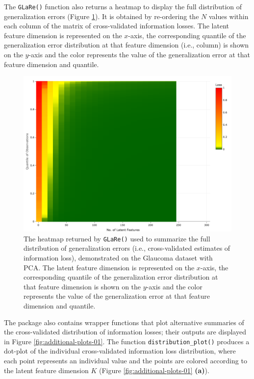 The \texttt{GLaRe()} function also returns a heatmap to display the full distribution of generalization errors (Figure \ref{fig:eye-heatmap}).
It is obtained by re-ordering the $N$ values within each column of the matrix of cross-validated information losses.
The latent feature dimension is represented on the $x$-axis, the corresponding quantile of the generalization error distribution at that feature dimension (i.e., column) is shown on the $y$-axis and the color represents the value of the generalization error at that feature dimension and quantile.


\begin{figure}
    \centering
    \includegraphics[width=0.5\linewidth]{figures/eye-heatmap.png}
    \caption{The heatmap returned by \texttt{GLaRe()} used to summarize the full distribution of generalization errors (i.e., cross-validated estimates of information loss), demonstrated on the Glaucoma dataset with PCA. The latent feature dimension is represented on the $x$-axis, the corresponding quantile of the generalization error distribution at that feature dimension is shown on the $y$-axis and the color represents the value of the generalization error at that feature dimension and quantile.}
    \label{fig:eye-heatmap}
\end{figure}

The  package also contains wrapper functions that plot alternative summaries of the cross-validated distribution of information losses; their outputs are displayed in Figure \ref{fig:additional-plots-01}.
The function \texttt{distribution\_plot()} produces a dot-plot of the individual cross-validated information loss distribution, where each point represents an individual value and the points are colored according to the latent feature dimension $K$ (Figure \ref{fig:additional-plots-01} \textbf{(a)}).

